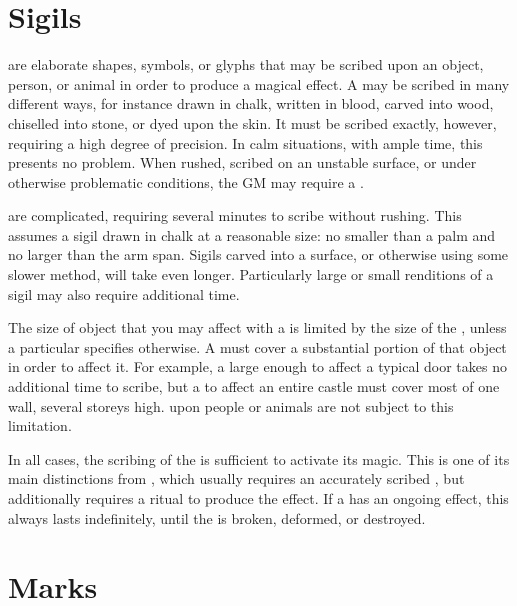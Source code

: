 
\section{Sigils}

\capital{\sigils} are elaborate shapes, symbols, or glyphs that may be scribed upon an object, person, or animal in order to produce a magical effect.
A {\sigil} may be scribed in many different ways, for instance drawn in chalk, written in blood, carved into wood, chiselled into stone, or dyed upon the skin.
It must be scribed exactly, however, requiring a high degree of precision.
In calm situations, with ample time, this presents no problem.
When rushed, scribed on an unstable surface, or under otherwise problematic conditions, the GM may require a  {\test}.

\capital{\sigils} are complicated, requiring several minutes to scribe without rushing.
This assumes a sigil drawn in chalk at a reasonable size: no smaller than a palm and no larger than the  arm span.
Sigils carved into a surface, or otherwise using some slower method, will take even longer.
Particularly large or small renditions of a sigil may also require additional time.

The size of object that you may affect with a {\sigil} is limited by the size of the {\sigil}, unless a particular {\sigil} specifies otherwise.
A {\sigil} must cover a substantial portion of that object in order to affect it.
For example, a {\sigil} large enough to affect a typical door takes no additional time to scribe, but a {\sigil} to affect an entire castle must cover most of one wall, several storeys high.
\capital{\sigils} upon people or animals are not subject to this limitation.

In all cases, the scribing of the {\sigil} is sufficient to activate its magic.
This is one of its main distinctions from , which usually requires an accurately scribed , but additionally requires a ritual to produce the effect.
If a {\sigil} has an ongoing effect, this always lasts indefinitely, until the {\sigil} is broken, deformed, or destroyed.

\section{Marks}

